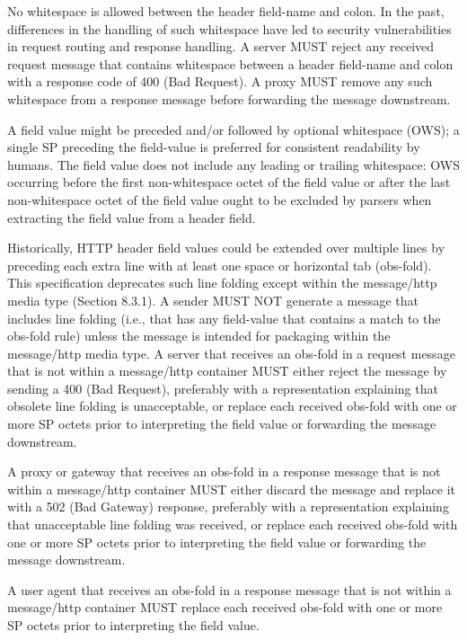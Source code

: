 No whitespace is allowed between the header field-name and colon.  In
the past, differences in the handling of such whitespace have led to
security vulnerabilities in request routing and response handling.  A
server MUST reject any received request message that contains
whitespace between a header field-name and colon with a response code
of 400 (Bad Request).  A proxy MUST remove any such whitespace from a
response message before forwarding the message downstream.

A field value might be preceded and/or followed by optional
whitespace (OWS); a single SP preceding the field-value is preferred
for consistent readability by humans.  The field value does not
include any leading or trailing whitespace: OWS occurring before the
first non-whitespace octet of the field value or after the last
non-whitespace octet of the field value ought to be excluded by
parsers when extracting the field value from a header field.

Historically, HTTP header field values could be extended over
multiple lines by preceding each extra line with at least one space
or horizontal tab (obs-fold).  This specification deprecates such
line folding except within the message/http media type
(Section 8.3.1).  A sender MUST NOT generate a message that includes
line folding (i.e., that has any field-value that contains a match to
the obs-fold rule) unless the message is intended for packaging
within the message/http media type.
A server that receives an obs-fold in a request message that is not
within a message/http container MUST either reject the message by
sending a 400 (Bad Request), preferably with a representation
explaining that obsolete line folding is unacceptable, or replace
each received obs-fold with one or more SP octets prior to
interpreting the field value or forwarding the message downstream.

A proxy or gateway that receives an obs-fold in a response message
that is not within a message/http container MUST either discard the
message and replace it with a 502 (Bad Gateway) response, preferably
with a representation explaining that unacceptable line folding was
received, or replace each received obs-fold with one or more SP
octets prior to interpreting the field value or forwarding the
message downstream.

A user agent that receives an obs-fold in a response message that is
not within a message/http container MUST replace each received
obs-fold with one or more SP octets prior to interpreting the field
value.

